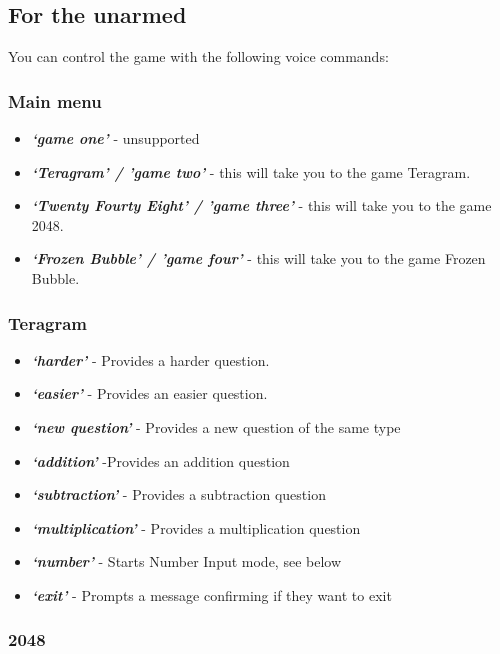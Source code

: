 \documentclass[11pt, oneside]{article}
\begin{document}
\subsection*{For the unarmed}

You can control the game with the following voice commands:

\subsubsection*{Main menu}

\begin{itemize}
  \item {\em\bf`game one'} - unsupported
  \item {\em\bf`Teragram' / 'game two'}  - this will take you to the game Teragram.
  \item {\em\bf`Twenty Fourty Eight' / 'game three'} - this will take you to the game 2048.
  \item {\em\bf`Frozen Bubble' / 'game four'} - this will take you to the game Frozen Bubble.
\end{itemize}

\subsubsection*{Teragram}

\begin{itemize}
  \item {\em\bf`harder'} - Provides a harder question. 
  \item {\em\bf`easier'} - Provides an easier question.
  \item {\em\bf`new question'} - Provides a new question of the same type
  \item {\em\bf`addition'} -Provides an addition question
  \item {\em\bf`subtraction'} - Provides a subtraction question
  \item {\em\bf`multiplication'} - Provides a multiplication question 
  \item {\em\bf`number'} - Starts Number Input mode, see below
  \item {\em\bf`exit'} - Prompts a message confirming if they want to exit
 
\end{itemize}

\subsubsection*{2048}
\end{document}
